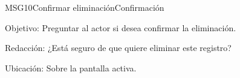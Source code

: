 \begin{mensaje}{MSG10}{Confirmar eliminación}{Confirmación}
	\item [Objetivo:] Preguntar al actor si desea confirmar la eliminación.
	\item[Redacción:] ¿Está seguro de que quiere eliminar este registro?
	\item [Ubicación:] Sobre la pantalla activa.
\end{mensaje}
